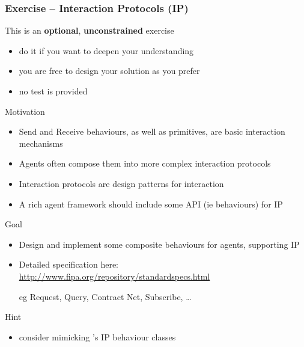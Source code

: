 \documentclass[presentation]{beamer}\mode<presentation>{\usetheme{AMSCesenaPurpleAndGold}}
\begin{document}
\begin{frame}[allowframebreaks]
\frametitle{Exercise \currentExercise{} -- \fipa{} Interaction Protocols (IP)}
	\begin{alertblock}{This is an \textbf{optional}, \textbf{unconstrained} exercise}
		\begin{itemize}
			\item do it if you want to deepen your understanding
			\item you are free to design your solution as you prefer
			\item no test is provided
		\end{itemize}
	\end{alertblock}

	\begin{block}{Motivation}
		\begin{itemize}
			\item Send and Receive behaviours, as well as \linda{} primitives, are \alert{basic} interaction mechanisms
			\item Agents often compose them into more complex \alert{interaction protocols}
			\item Interaction protocols are design patterns for interaction 
			\item A rich agent framework should include some API (ie behaviours) for IP
		\end{itemize}
	\end{block}

	\begin{block}{Goal}
		\begin{itemize}
			\item Design and implement some composite behaviours for agents, supporting \fipa{} IP
			\item Detailed specification here: \url{http://www.fipa.org/repository/standardspecs.html}
			\item[eg] Request, Query, Contract Net, Subscribe, \ldots
		\end{itemize}
	\end{block}

	\begin{exampleblock}{Hint}
		\begin{itemize}
			\item consider mimicking \jade{}'s IP behaviour classes
		\end{itemize}
	\end{exampleblock}
\end{frame}
\end{document}
